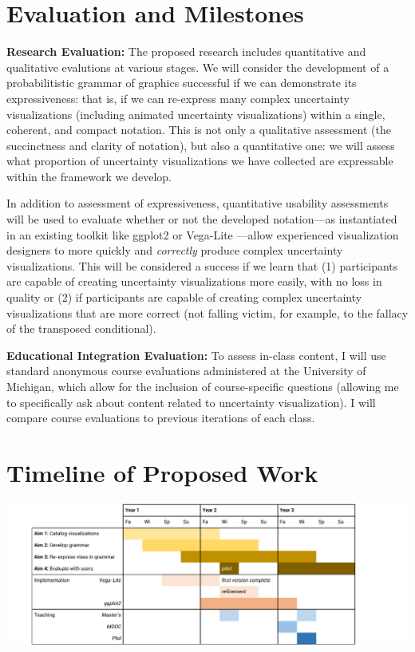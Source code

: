 \documentclass[11pt]{article}
\begin{document}
\section{Evaluation and Milestones}

\noindent\textbf{Research Evaluation:}
The proposed research includes quantitative and qualitative evalutions at various stages. We will consider the development of a probabilitistic grammar of graphics successful if we can demonstrate its expressiveness: that is, if we can re-express many complex uncertainty visualizations (including animated uncertainty visualizations) within a single, coherent, and compact notation. This is not only a qualitative assessment (the succinctness and clarity of notation), but also a quantitative one: we will assess what proportion of uncertainty visualizations we have collected are expressable within the framework we develop.

In addition to assessment of expressiveness, quantitative usability assessments will be used to evaluate whether or not the developed notation---as instantiated in an existing toolkit like ggplot2 \cite{wickham2016ggplot2} or Vega-Lite \cite{Satyanarayan2017vegalite}---allow experienced visualization designers to more quickly and \emph{correctly} produce complex uncertainty visualizations. This will be considered a success if we learn that (1) participants are capable of creating uncertainty visualizations more easily, with no loss in quality or (2) if participants are capable of creating complex uncertainty visualizations that are more correct (not falling victim, for example, to the fallacy of the transposed conditional).

\noindent\textbf{Educational Integration Evaluation:}
To assess in-class content, I will use standard anonymous course evaluations administered at the University of Michigan, which allow for the inclusion of course-specific questions (allowing me to specifically ask about content related to uncertainty visualization). I will compare course evaluations to previous iterations of each class.


\section{Timeline of Proposed Work}

\includegraphics[width=\columnwidth]{img/timeline}
\end{document}
